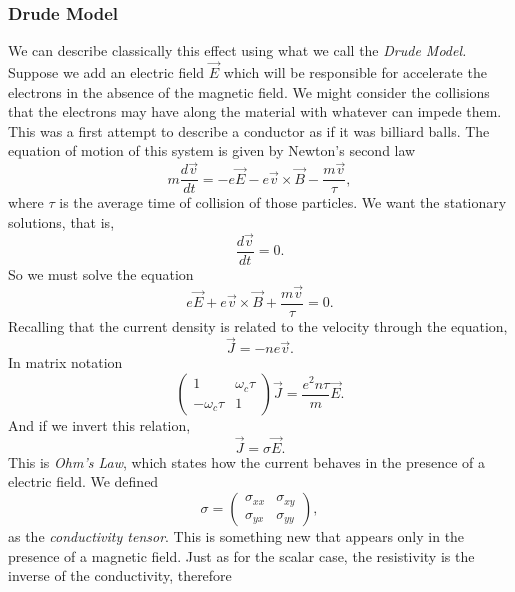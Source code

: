 \documentclass{article}
\begin{document}
\subsubsection{Drude Model}
We can describe classically this effect using what we call the \textit{Drude Model.} Suppose we add an electric field $\vec{E}$  which will be responsible for accelerate the electrons in the absence of the magnetic field. We might consider the collisions that the electrons may have along the material with whatever can impede them. This was a first attempt to describe a conductor as if it was billiard balls. The equation of motion of this system is given by Newton's second law 
\begin{equation}
	m\frac{d\vec{v}}{dt}=-e\vec{E}-e\vec{v}\times\vec{B}-\frac{m\vec{v}}{\tau},
\end{equation}
where $\tau$ is the average time of collision of those particles.
We want the stationary solutions, that is, 
\begin{equation*}
	\frac{d\vec{v}}{dt}=0.
\end{equation*}
So we must solve the equation 
\begin{equation}
	e\vec{E}+e\vec{v}\times\vec{B}+\frac{m\vec{v}}{\tau}=0.
\end{equation}
Recalling that the current density is related to the velocity through the equation,
\begin{equation}
	\vec{J}=-ne\vec{v}.
\end{equation}
In matrix notation 
\begin{equation}
	\begin{pmatrix}1 & \omega_c\tau \\-\omega_c\tau & 1 \end{pmatrix}\vec{J}=\frac{e^2n\tau}{m}\vec{E}.
\end{equation}
And if we invert this relation, 
\begin{equation}\label{ohm law}
	\vec{J}=\sigma\vec{E}.
\end{equation}
This is \textit{Ohm’s Law}, which states how the current behaves in the presence of a electric field. We defined 
\begin{equation}
	\sigma=\begin{pmatrix}
		\sigma_{xx} & \sigma_{xy} \\
		\sigma_{yx} & \sigma_{yy} 
	\end{pmatrix},
\end{equation}
as the \textit{conductivity tensor}. This is something new that appears only in the presence of a magnetic field. Just as for the scalar case, the resistivity is the inverse of the conductivity, therefore 
\end{document}

